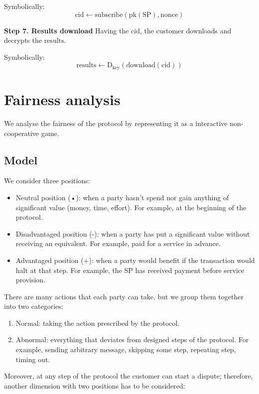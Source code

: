 \documentclass{ieeeaccess}
\begin{document}
Symbolically: \[
\mathrm{cid} \gets \mathrm{subscribe}(\mathrm{pk}(\mathrm{SP}), \mathrm{nonce})
\]

\noindent \textbf
{Step 7. Results download}\label{step-7-results-download} Having the $\mathrm{cid}$, the customer downloads and decrypts the $\mathrm{results}$.

Symbolically: \[
\mathrm{results} \gets \mathrm{D}_{\mathrm{key}}(\mathrm{download}(\mathrm{cid}))
\]


\section{Fairness analysis}\label{sec:fairness-analysis}

We analyse the fairness of the protocol by representing it as a interactive non-cooperative game.

\subsection{Model}\label{model}
We consider three positions:

\begin{itemize}
\item
  Neutral position (•): when a party hasn't spend nor gain anything of significant value (money, time, effort). For example, at the beginning of the protocol.
\item
  Disadvantaged position (-): when a party has put a significant value without receiving an equivalent. For example, paid for a service in advance.
\item
  Advantaged position (+): when a party would benefit if the transaction would halt at that step. For example, the SP has received payment before service provision.
\end{itemize}

There are many actions that each party can take, but we group them together into two categories:

\begin{enumerate}
\def\labelenumi{\arabic{enumi}.}

\item
  Normal: taking the action prescribed by the protocol.
\item
  Abnormal: everything that deviates from designed steps of the protocol. For example, sending arbitrary message, skipping some step, repeating step, timing out.
\end{enumerate}

Moreover, at any step of the protocol the customer can start a dispute; therefore, another dimension with two positions has to be considered:
\end{document}
